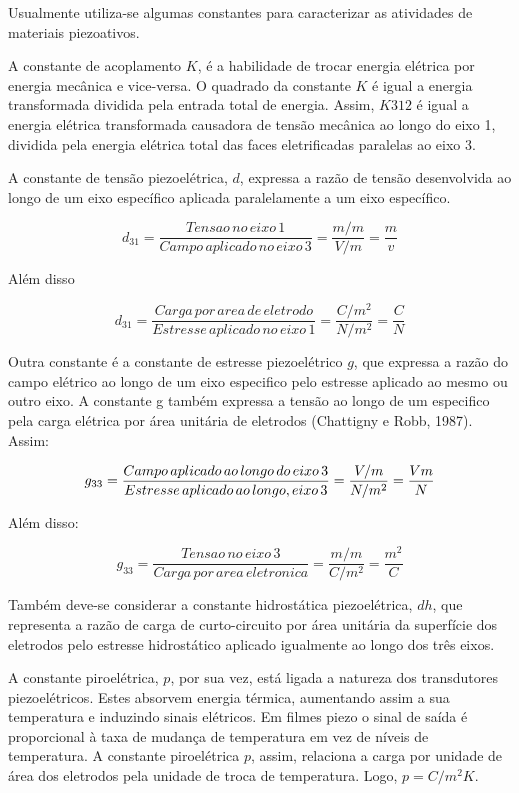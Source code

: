 \documentclass[
	12pt,				
	oneside,			
	a4paper,			
	english,			
	brazil				
	]{abntex2ppgsi}
\begin{document}
Usualmente utiliza-se algumas constantes para caracterizar as atividades de materiais piezoativos. 

A constante de acoplamento $K$, é a habilidade de trocar energia elétrica por energia mecânica e vice-versa. O quadrado da constante $K$ é igual a energia transformada dividida pela entrada total de energia. Assim, $K312$ é igual a energia elétrica transformada causadora de tensão mecânica ao longo do eixo 1, dividida pela energia elétrica total das faces eletrificadas paralelas ao eixo 3. 

A constante de tensão piezoelétrica, $d$, expressa a razão de tensão desenvolvida ao longo de um eixo específico aplicada paralelamente a um eixo específico. 

\[d_{31} = \frac{Tensao \,no \,eixo \,1}{Campo \,aplicado \,no \,eixo \,3} = \frac{m/m}{V/m} = \frac{m}{v} \]

Além disso

\[d_{31} = \frac{Carga \,por \,area \,de \,eletrodo}{Estresse \,aplicado \,no \,eixo \,1} = \frac{C/m^{2}}{N/m^{2}} = \frac{C}{N} \]

Outra constante é a constante de estresse piezoelétrico $g$, que expressa a razão do campo elétrico ao longo de um eixo especifico pelo estresse aplicado ao mesmo ou outro eixo. A constante g também expressa a tensão ao longo de um especifico pela carga elétrica por área unitária de eletrodos (Chattigny e Robb, 1987). Assim:

\[g_{33} = \frac{Campo \,aplicado \,ao \,longo \,do \,eixo \,3}{Estresse \,aplicado \,ao \,longo ,\do \,eixo \,3} = \frac{V/m}{N/m^{2}} = \frac{Vm}{N} \]

Além disso:

\[g_{33} = \frac{Tensao \,no \,eixo \,3}{Carga \,por \,area \,eletronica} = \frac{m/m}{C/m^{2}} = \frac{m^{2}}{C} \]

Também deve-se considerar a constante hidrostática piezoelétrica, $dh$, que representa a razão de carga de curto-circuito por área unitária da superfície dos eletrodos pelo estresse hidrostático aplicado igualmente ao longo dos três eixos. 

A constante piroelétrica, $p$, por sua vez, está ligada a natureza dos transdutores piezoelétricos. Estes absorvem energia térmica, aumentando assim a sua temperatura e induzindo sinais elétricos. Em filmes piezo o sinal de saída é proporcional à taxa de mudança de temperatura em vez de níveis de temperatura. A constante piroelétrica $p$, assim, relaciona a carga por unidade de área dos eletrodos pela unidade de troca de temperatura. Logo, $p = C/m^{2} K$.
\end{document}
